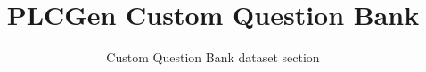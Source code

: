 \documentclass[11pt]{article}
\title{PLCGen Custom Question Bank}
\author{Custom Question Bank dataset section}
\date{}
\begin{document}
\sloppy
\maketitle
\tableofcontents
\newpage

\appendix

\end{document}
